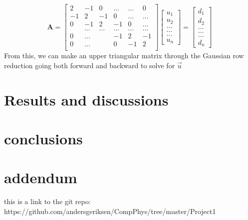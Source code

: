 \documentclass[10pt,showpacs,preprintnumbers,footinbib,amsmath,amssymb,aps,prl,twocolumn,groupedaddress,superscriptaddress,showkeys]{revtex4-1}
\begin{document}
 \[
\mathbf{A} = \begin{bmatrix}
                    2& -1& 0 &\dots   & \dots &0 \\
                    -1 & 2 & -1 &0 &\dots &\dots \\
                    0&-1 &2 & -1 & 0 & \dots \\
                    & \dots   & \dots &\dots   &\dots & \dots \\
                    0&\dots   &  &-1 &2& -1 \\
                    0&\dots    &  & 0  &-1 & 2 \\
              \end{bmatrix}
              \begin{bmatrix}
              		u_1 \\
              		u_2 \\
              		\dots \\
              		\dots \\
              		\dots \\
              		u_n
              \end{bmatrix} =
			  \begin{bmatrix}
              		d_1 \\
              		d_2 \\
              		\dots \\
              		\dots \\
              		\dots \\
              		d_n
              \end{bmatrix}              
\]
From this, we can make an upper triangular matrix through the Gaussian row reduction going both forward and backward to solve for $\vec{u}$

\section{Results and discussions}

\section{conclusions}

\section{addendum}
this is a link to the git repo:
https://github.com/andersgeriksen/CompPhys/tree/master/Project1
\end{document}
